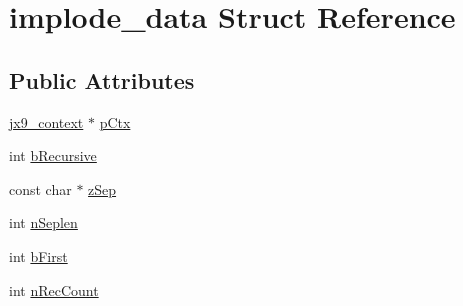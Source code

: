 \hypertarget{structimplode__data}{\section{implode\-\_\-data Struct Reference}
\label{d7/d2e/structimplode__data}
}
\subsection*{Public Attributes}
\begin{DoxyCompactItemize}
\item 
\hyperlink{structjx9__context}{jx9\-\_\-context} $\ast$ \hyperlink{structimplode__data_af266722e48dec4b368d2b2a18a80938a}{p\-Ctx}
\item 
int \hyperlink{structimplode__data_aac9a253672e3bf293cc29c303ee558fd}{b\-Recursive}
\item 
const char $\ast$ \hyperlink{structimplode__data_af9bb28c0606b1d8f6cc82df2104b3af6}{z\-Sep}
\item 
int \hyperlink{structimplode__data_a2f5d9d3d6d16d30463b43eb79c3e30f5}{n\-Seplen}
\item 
int \hyperlink{structimplode__data_af12fa6997306e269d65598745aaef658}{b\-First}
\item 
int \hyperlink{structimplode__data_a8f0b3b2494c0f8dd09f62a76a13f4164}{n\-Rec\-Count}
\end{DoxyCompactItemize}


